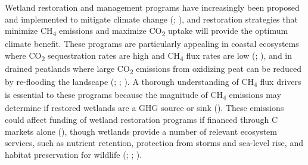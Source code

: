 \documentclass[
  12pt,
]{article}
\begin{document}
Wetland restoration and management programs have increasingly been
proposed and implemented to mitigate climate change
(;
), and
restoration strategies that minimize CH\textsubscript{4} emissions and
maximize CO\textsubscript{2} uptake will provide the optimum climate
benefit. These programs are particularly appealing in coastal ecosystems
where CO\textsubscript{2} sequestration rates are high and
CH\textsubscript{4} flux rates are low
(; ), and in drained peatlands where large
CO\textsubscript{2} emissions from oxidizing peat can be reduced by
re-flooding the landscape (; ; ). A thorough understanding of CH\textsubscript{4}
flux drivers is essential to these programs because the magnitude of
CH\textsubscript{4} emissions may determine if restored wetlands are a
GHG source or sink (). These emissions could affect funding of wetland
restoration programs if financed through C markets alone
(),
though wetlands provide a number of relevant ecosystem services, such as
nutrient retention, protection from storms and sea-level rise, and
habitat preservation for wildlife
(;
;
).
\end{document}
